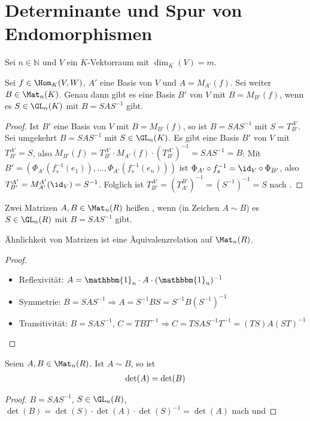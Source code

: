 \section{Determinante und Spur von Endomorphismen}

Sei $n\in \mathbb N$ und $V$ ein $K$-Vektorraum mit $\dim_K(V)=m$.

\begin{proposition}
	Sei $f\in \Hom_K(V,W)$, $A'$ eine Basis von $V$ und $A=M_{A'}(f)$. Sei weiter $B\in \Mat_n(K)$. Genau 
	dann gibt es eine Basis $B'$ von $V$ mit $B=M_{B'}(f)$, wenn es $S\in \GL_n(K)$ mit $B=SAS^{-1}$ gibt.
\end{proposition}
\begin{proof}
	Ist $B'$ eine Basis von $V$ mit $B=M_{B'}(f)$, so ist $B=SAS^{-1}$ mit $S=T^{A'}_{B'}$. Sei umgekehrt $B=SAS^{-1}$ mit 
	$S\in \GL_n(K)$. Es gibt eine Basis $B'$ von $V$ mit $T^{A'}_{B'}=S$, also $M_{B'}(f)=T^{A'}_{B'}\cdot M_{A'}(f)\cdot (
	T^{A'}_{B'})^{-1}=SAS^{-1}=B$: Mit $B'=(\Phi_{A'}(f_s^{-1}(e_1)),...,\Phi_{A'}(f_s^{-1}(e_n)))$ ist $\Phi_{A'}\circ f_s^{-1}=
	\id_V\circ \Phi_{B'}$, also $T^{A'}_{B'}=M_{A'}^{A'}(\id_V)=S^{-1}$. Folglich ist $T^{A'}_{B'}=(T_{A'}^{B'})^{-1}=(S^{-1})^{-1}
	=S$ nach .
\end{proof}

\begin{definition}[Ähnlichkeit]
	Zwei Matrizen $A,B\in \Mat_n(R)$ heißen , wenn (in Zeichen $A\sim B$) es 
	$S\in \GL_n(R)$ mit $B=SAS^{-1}$ gibt.
\end{definition}

\begin{proposition}
	Ähnlichkeit von Matrizen ist eine Äquivalenzrelation auf $\Mat_n(R)$.
\end{proposition}
\begin{proof}
	\begin{itemize}
		\item Reflexivität: $A=\mathbbm{1}_n\cdot A \cdot (\mathbbm{1}_n)^{-1}$
		\item Symmetrie: $B=SAS^{-1}\Rightarrow A=S^{-1}BS=S^{-1}B(S^{-1})^{-1}$
		\item Transitivität: $B=SAS^{-1}$, $C=TBT^{-1}\Rightarrow C=TSAS^{-1}T^{-1}=(TS)A(ST)^{-1}$
	\end{itemize}
\end{proof}

\begin{proposition}
	Seien $A,B\in \Mat_n(R)$. Ist $A\sim B$, so ist
	\begin{align}
		\det(A)=\det(B)\notag
	\end{align}
\end{proposition}
\begin{proof}
	$B=SAS^{-1}$, $S\in \GL_n(R)$, $\det(B)=\det(S)\cdot \det(A)\cdot \det(S)^{-1}=\det(A)$ nach  und 
\end{proof}

